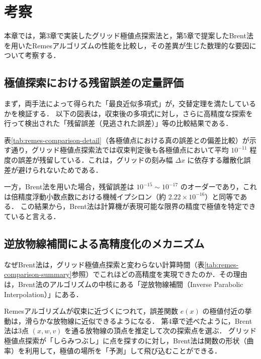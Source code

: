 \section{考察}
\label{sec:discussion}

本章では，第3章で実装したグリッド極値点探索法と，第5章で提案したBrent法を用いたRemesアルゴリズムの性能を比較し，その差異が生じた数理的な要因について考察する．

\subsection{極値探索における残留誤差の定量評価}
  \label{subsec:residual_error}
まず，両手法によって得られた「最良近似多項式」が，交替定理を満たしているかを検証する．
以下の図表は，収束後の多項式に対し，さらに高精度な探索を行って検出された「残留誤差（見逃された誤差）」等の比較結果である．



表\ref{tab:remes-comparison-detail}（各極値点における真の誤差との偏差比較）が示す通り，グリッド極値点探索法では収束判定後も各極値点において平均 $10^{-11}$ 程度の誤差が残留している．これは，グリッドの刻み幅 $\Delta x$ に依存する離散化誤差が避けられないためである．

一方，Brent法を用いた場合，残留誤差は $10^{-15} \sim 10^{-17}$ のオーダーであり，これは倍精度浮動小数点数における機械イプシロン（約 $2.22 \times 10^{-16}$）と同等である．
この結果から，Brent法は計算機が表現可能な限界の精度で極値を特定できていると言える．

\subsection{逆放物線補間による高精度化のメカニズム}

なぜBrent法は，グリッド極値点探索と変わらない計算時間（表\ref{tab:remes-comparison-summary}参照）でこれほどの高精度を実現できたのか．その理由は，Brent法のアルゴリズムの中核にある「逆放物線補間（Inverse Parabolic Interpolation）」にある．

Remesアルゴリズムが収束に近づくにつれて，誤差関数 $e(x)$ の極値付近の挙動は，滑らかな放物線に近似できるようになる．
第4章で述べたように，Brent法は3点 $(x, w, v)$ を通る放物線の頂点を推定して次の探索点を選ぶ\cite{brent-original}．
グリッド極値点探索が「しらみつぶし」に点を探すのに対し，Brent法は関数の形状（曲率）を利用して，極値の場所を「予測」して飛び込むことができる．

